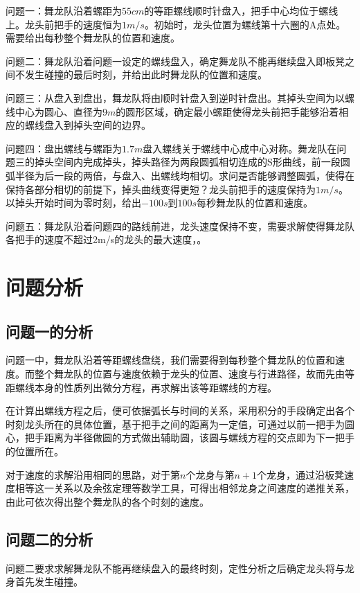 \documentclass[withoutpreface,bwprint]{cumcmthesis} %
\begin{document}
问题一：舞龙队沿着螺距为$55cm$的等距螺线顺时针盘入，把手中心均位于螺线上。龙头前把手的速度恒为$1m/s$。初始时，龙头位置为螺线第十六圈的A点处。需要给出每秒整个舞龙队的位置和速度。

问题二：舞龙队沿着问题一设定的螺线盘入，确定舞龙队不能再继续盘入即板凳之间不发生碰撞的最后时刻，并给出此时舞龙队的位置和速度。

问题三：从盘入到盘出，舞龙队将由顺时针盘入到逆时针盘出。其掉头空间为以螺线中心为圆心、直径为$9m$的圆形区域，确定最小螺距使得龙头前把手能够沿着相应的螺线盘入到掉头空间的边界。

问题四：盘出螺线与螺距为$1.7m$盘入螺线关于螺线中心成中心对称。舞龙队在问题三的掉头空间内完成掉头，掉头路径为两段圆弧相切连成的S形曲线，前一段圆弧半径为后一段的两倍，与盘入、出螺线均相切。求问是否能够调整圆弧，使得在保持各部分相切的前提下，掉头曲线变得更短？龙头前把手的速度保持为$1m/s$。以掉头开始时间为零时刻，给出$-100s$到$100s$每秒舞龙队的位置和速度。

问题五：舞龙队沿着问题四的路线前进，龙头速度保持不变，需要求解使得舞龙队各把手的速度不超过2m/s的龙头的最大速度，。

\section{问题分析}

\subsection{问题一的分析}

问题一中，舞龙队沿着等距螺线盘绕，我们需要得到每秒整个舞龙队的位置和速度。而整个舞龙队的位置与速度依赖于龙头的位置、速度与行进路径，故而先由等距螺线本身的性质列出微分方程，再求解出该等距螺线的方程。

在计算出螺线方程之后，便可依据弧长与时间的关系，采用积分的手段确定出各个时刻龙头所在的具体位置，基于把手之间的距离为一定值，可通过以前一把手为圆心，把手距离为半径做圆的方式做出辅助圆，该圆与螺线方程的交点即为下一把手的位置所在。

对于速度的求解沿用相同的思路，对于第$n$个龙身与第$n+1$个龙身，通过沿板凳速度相等这一关系以及余弦定理等数学工具，可得出相邻龙身之间速度的递推关系，由此可依次得出整个舞龙队的各个时刻的速度。

\subsection{问题二的分析}

问题二要求求解舞龙队不能再继续盘入的最终时刻，定性分析之后确定龙头将与龙身首先发生碰撞。
\end{document}
